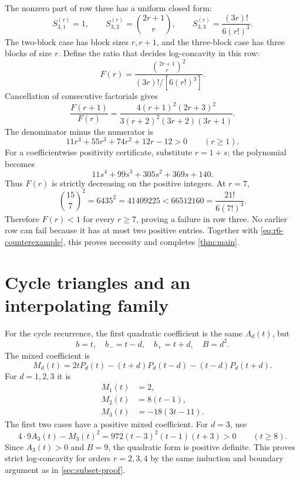 \documentclass[11pt,a4paper]{article}
\numberwithin{equation}{section}
\theoremstyle{definition}
\theoremstyle{remark}
\begin{document}
The nonzero part of row three has a uniform closed form:
\begin{equation}\label{eq:row3}
 S^{(r)}_{3,1}=1,\qquad
 S^{(r)}_{3,2}=\binom{2r+1}{r},\qquad
 S^{(r)}_{3,3}=\frac{(3r)!}{6(r!)^3}.
\end{equation}
The two-block case has block sizes $r,r+1$, and the three-block case
has three blocks of size $r$.
Define the ratio that decides log-concavity in this row:
\begin{equation}\label{eq:Fr}
 F(r)=\frac{\binom{2r+1}{r}^{\!2}}{(3r)!/[6(r!)^3]}.
\end{equation}
Cancellation of consecutive factorials gives
\begin{equation}\label{eq:F-ratio}
 \frac{F(r+1)}{F(r)}
  =\frac{4(r+1)^2(2r+3)^2}{3(r+2)^2(3r+2)(3r+1)}.
\end{equation}
The denominator minus the numerator is
\begin{equation}\label{eq:ratio-gap}
 11r^4+55r^3+74r^2+12r-12>0\qquad(r\ge1).
\end{equation}
For a coefficientwise positivity certificate, substitute $r=1+s$; the
polynomial becomes
\[
 11s^4+99s^3+305s^2+369s+140.
\]
Thus $F(r)$ is strictly decreasing on the positive integers. At $r=7$,
\[
 \binom{15}{7}^2=6435^2=41409225<66512160
             =\frac{21!}{6(7!)^3}.
\]
Therefore $F(r)<1$ for every $r\ge7$, proving a failure in row three.
No earlier row can fail because it has at most two positive entries.
Together with \eqref{eq:r6-counterexample}, this proves necessity and
completes \cref{thm:main}.

\section{Cycle triangles and an interpolating family}\label{sec:cycle-proof}

For the cycle recurrence, the first quadratic coefficient is the same
$A_d(t)$, but
\[
 b=t,\quad b_-=t-d,\quad b_+=t+d,\quad B=d^2.
\]
The mixed coefficient is
\begin{equation}\label{eq:Md}
 M_d(t)=2tP_d(t)-(t+d)P_d(t-d)-(t-d)P_d(t+d).
\end{equation}
For $d=1,2,3$ it is
\begin{align}
 M_1(t)&=2,\label{eq:M1}\\
 M_2(t)&=8(t-1),\label{eq:M2}\\
 M_3(t)&=-18(3t-11).\label{eq:M3}
\end{align}
The first two cases have a positive mixed coefficient. For $d=3$, use
\begin{equation}\label{eq:cycle4-discriminant}
 4\cdot9A_3(t)-M_3(t)^2
      =972(t-3)^2(t-1)(t+3)>0\qquad(t\ge8).
\end{equation}
Since $A_3(t)>0$ and $B=9$, the quadratic form is positive definite.
This proves strict log-concavity for orders $r=2,3,4$ by the same induction
and boundary argument as in \cref{sec:subset-proof}.
\end{document}
